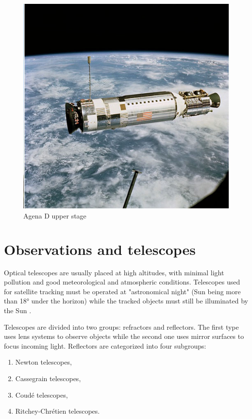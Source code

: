 \begin{figure}[H]
  \includegraphics[width=\linewidth]{images/upperstage}
  \caption{Agena D upper stage}
  \label{fig:upperstage}
\end{figure}
	
\pagebreak


\section{Observations and telescopes}\label{sec:observations_telescopes}

Optical telescopes are usually placed at high altitudes, with minimal light pollution and good meteorological and atmospheric conditions. Telescopes used for satellite tracking must be operated at "astronomical night" (Sun being more than 18° under the horizon) while the tracked objects must still be illuminated by the Sun \citep{klinkrad2006space}.

	Telescopes are divided into two groups: refractors and reflectors. The first type uses lens systems to observe objects while the second one uses mirror surfaces to focus incoming light. Reflectors are categorized into four subgroups:
	
\begin{enumerate}
	\item Newton telescopes,
	\item Cassegrain telescopes,
	\item Coudé telescopes,
	\item Ritchey-Chrétien telescopes.
\end{enumerate}
	
